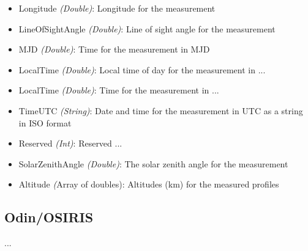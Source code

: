 \begin{itemize}
\begin{itemize}
            \item Longitude \emph{(Double)}: Longitude for the measurement
            \item LineOfSightAngle \emph{(Double)}: Line of sight angle for the
                measurement
            \item MJD \emph{(Double)}: Time for the measurement in MJD
            \item LocalTime \emph{(Double)}: Local time of day for the
                measurement in ... 
            \item LocalTime \emph{(Double)}: Time for the measurement in ...
            \item TimeUTC \emph{(String)}: Date and time for the measurement in
                UTC as a string in ISO format
            \item Reserved \emph{(Int)}: Reserved ... 
            \item SolarZenithAngle \emph{(Double)}: The solar zenith angle for
                the measurement
            \item Altitude \emph({Array of doubles}): Altitudes (km) for the
                measured profiles
        \end{itemize}
\end{itemize}


\subsection{Odin/OSIRIS}
...



